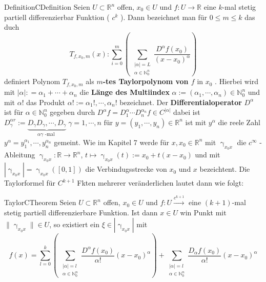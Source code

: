 \begin{ibox}[]{Definition}{CDefinition}
    Seien $ U \subset \mathbb{R}^n  $ offen, $ x_0 \in U $ und $ f: U \to \mathbb{R}  $ eine $ k $-mal stetig partiell differenzierbar
	Funktion ( $ c^{k} $ ). Dann bezeichnet man für $ 0 \leq  m \leq k $ das duch
	$$ T_{f, x_0, m} \left(x\right) : \sum_{i=0}^{m} \left( \, \sum_{ \substack{ |\alpha| = L \\ \alpha \in \mathbb{N}_{0}^{n} }}
	\frac{D^{\alpha }f \left(x_0\right) }{\left( x - x_0 \right) ^{\alpha }} \right) $$ 
		definiert Polynom $ T_{f,x_0,m} $ als \textbf{ $ m $-tes Taylorpolynom von $ f \text{ in } x_0 $ }. Hierbei wird mit 
	$ |\alpha| : = \alpha_1 +  \cdots + \alpha_n $ die \textbf{Länge des Multiindex} $ \alpha := \left( \alpha_1, \cdots,  \alpha_{n} \right) \in \mathbb{N}_{0}^{n} $ und mit $ \alpha ! $ das Produkt $ \alpha ! := \alpha_1 ! , \cdots,  \alpha_{n} ! $ bezeichnet. Der 
	\textbf{Differentialoperator} $ D^{\alpha } $ ist für $ \alpha  \in \mathbb{N}_{0}^{n} $ gegeben durch $ D^{\alpha }f = 
	D_1^{\alpha } \cdots  D_n^{\alpha_n} f \in C^{|\alpha |}$ dabei ist $ D_{\gamma }^{\alpha r} := \underbrace{ D_{\gamma } 
	D_{\gamma }, \cdots,  D_{\gamma }}_{\alpha \gamma \text{ -mal } } \; \gamma = 1, \cdots,  n \text{ für } y = \left( y_1
, \cdots,  y_n\right) \in \mathbb{R}^n $	ist mit  $ y^{\alpha } $ die reele Zahl $ y^{\alpha } = y_1^{\alpha_1},
\cdots,  y_n^{\alpha_n} $  gemeint. Wie im Kapitel 7 werde für $ x,x_0 \in \mathbb{R}^n  $ mit $ \upgamma_{x_0x} $ die $ c^{ \infty } $
-Ableitung $ \upgamma_{x_0x}: \mathbb{R}  \to \mathbb{R}^n  $, $ t \mapsto \upgamma_{x_0x} \left(t\right) := x_0 + t(x-x_0)$ und mit
$  \left| \upgamma_{x_0x} \right| = \upgamma_{x_0x} \left( \left[ 0,1 \right]  \right)  $ die Verbindugsstrecke von $ x_0 \text{ und }
x $ bezeichtent. Die Taylorformel für $ C^{k+1} $ Fkten mehrerer veränderlichen lautet dann wie folgt:
\end{ibox}
\begin{ibox}[40]{Taylor}{CTheorem}
	Seien $ U \subset \mathbb{R}^n  $ offen, $ x_0 \in U $ und $ f:U \xrightarrow{c^{k+1}}$ eine $ (k+1) $-mal stetig 
	partiell differenzierbare Funktion. Ist dann $ x \in  U $ win Punkt mit $ \| \upgamma_{x_0x} \| \in U $, so existiert ein 
	$ \xi \in \left| \upgamma_{x_0x} \right|  $ mit 
	$$ f \left(x\right) = \sum_{l=0}^{k} \left( \, \sum_{ \substack{ |\alpha | = l \\ \alpha \in \mathbb{N}_{0}^{n} }} 
	\frac{D^{\alpha }f \left(x_0\right) }{\alpha !} \left( x - x_0 \right) ^{\alpha } \right) + \sum_{ \substack{ |\alpha | = l \\ 
\alpha  \in  \mathbb{N}_{0}^{n}}} \frac{D_{\alpha }f \left(x_0\right) }{\alpha !} \left( x-x_0 \right) ^{\alpha } $$
\end{ibox}
 
